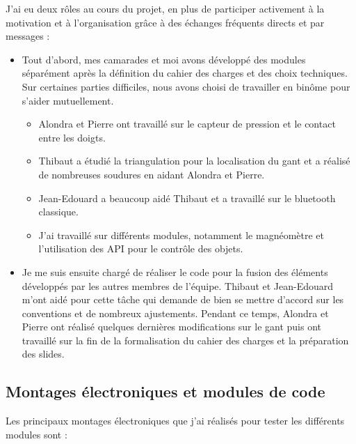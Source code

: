 \documentclass[10pt]{article}
\begin{document}
        J'ai eu deux rôles au cours du projet, en plus de participer activement à la motivation et à l'organisation grâce à des 
            échanges fréquents directs et par messages :
            \begin{itemize}
                \item Tout d'abord, mes camarades et moi avons développé des modules séparément après la définition du cahier des charges et des choix techniques.
                        Sur certaines parties difficiles, nous avons choisi de travailler en binôme pour s'aider mutuellement.
                        \begin{itemize}
                            \item Alondra et Pierre ont travaillé sur le capteur de pression et le contact entre les doigts.
                            \item Thibaut a étudié la triangulation pour la localisation du gant et a réalisé de nombreuses soudures
                                    en aidant Alondra et Pierre.
                            \item Jean-Edouard a beaucoup aidé Thibaut et a travaillé sur le bluetooth classique.
                            \item J'ai travaillé sur différents modules, notamment le magnéomètre et l'utilisation des API pour le contrôle des objets.
                        \end{itemize} 
                \item Je me suis ensuite chargé de réaliser le code pour la fusion des éléments développés par les autres membres de l'équipe.
                        Thibaut et Jean-Edouard m'ont aidé pour cette tâche qui demande de bien se mettre d'accord sur les conventions et de nombreux ajustements.
                        Pendant ce temps, Alondra et Pierre ont réalisé quelques dernières modifications sur le gant 
                        puis ont travaillé sur la fin de la formalisation du cahier des charges
                            et la préparation des slides.
            \end{itemize}
               
        \subsection{Montages électroniques et modules de code}

            Les principaux montages électroniques que j'ai réalisés pour tester les différents modules sont :
\end{document}
